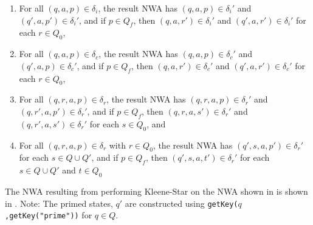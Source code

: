 \begin{enumerate} 

\item For all $(q,a,p) \in \delta_i$, the result NWA has $(q,a,p) \in
  \delta_i'$ and $(q',a,p') \in \delta_i'$, and if $p \in Q_f$, then
  $(q,a,r') \in \delta_i'$ and $(q',a,r') \in \delta_i'$ for each $r \in
  Q_0$,

\item For all $(q,a,p) \in \delta_c$, the result NWA has $(q,a,p) \in
  \delta_c'$ and $(q',a,p) \in \delta_c'$, and if $p \in Q_f$, then $(q,a,r')
  \in \delta_c'$ and $(q',a,r') \in \delta_c'$ for each $r \in Q_0$,

\item For all $(q,r,a,p) \in \delta_r$, the result NWA has $(q,r,a,p) \in
  \delta_r'$ and $(q,r',a,p') \in \delta_r'$, and if $p \in Q_f$, then
  $(q,r,a,s') \in \delta_r'$ and $(q,r',a,s') \in \delta_r'$ for each $s \in
  Q_0$, and

\item For all $(q,r,a,p) \in \delta_r$ with $r \in Q_0$, the result NWA has
  $(q',s,a,p') \in \delta_r'$ for each $s \in Q \cup Q'$, and if $p \in Q_f$,
  then $(q',s,a,t') \in \delta_r'$ for each $s \in Q \cup Q'$ and $t \in Q_0$

\end{enumerate}  

\noindent The NWA resulting from performing Kleene-Star on the NWA shown in
 is shown in .  Note: The primed
states, $q'$ are constructed using \texttt{getKey($q$,getKey("prime"))} for
$q \in Q$.

